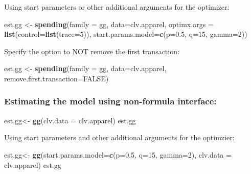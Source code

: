 \documentclass[
]{article}
\newenvironment{Shaded}{\begin{snugshade}}{\end{snugshade}}
\newcommand{\AttributeTok}[1]{\textcolor[rgb]{0.13,0.29,0.53}{#1}}
\newcommand{\ConstantTok}[1]{\textcolor[rgb]{0.56,0.35,0.01}{#1}}
\newcommand{\DecValTok}[1]{\textcolor[rgb]{0.00,0.00,0.81}{#1}}
\newcommand{\FloatTok}[1]{\textcolor[rgb]{0.00,0.00,0.81}{#1}}
\newcommand{\FunctionTok}[1]{\textcolor[rgb]{0.13,0.29,0.53}{\textbf{#1}}}
\newcommand{\NormalTok}[1]{#1}
\newcommand{\OtherTok}[1]{\textcolor[rgb]{0.56,0.35,0.01}{#1}}
\begin{document}
Using start parameters or other additional arguments for the optimizer:

\begin{Shaded}
\begin{Highlighting}[]
\NormalTok{est.gg }\OtherTok{\textless{}{-}} \FunctionTok{spending}\NormalTok{(}\AttributeTok{family =}\NormalTok{ gg, }\AttributeTok{data=}\NormalTok{clv.apparel, }
                   \AttributeTok{optimx.args =} \FunctionTok{list}\NormalTok{(}\AttributeTok{control=}\FunctionTok{list}\NormalTok{(}\AttributeTok{trace=}\DecValTok{5}\NormalTok{)),}
                   \AttributeTok{start.params.model=}\FunctionTok{c}\NormalTok{(}\AttributeTok{p=}\FloatTok{0.5}\NormalTok{, }\AttributeTok{q=}\DecValTok{15}\NormalTok{, }\AttributeTok{gamma=}\DecValTok{2}\NormalTok{))}
\end{Highlighting}
\end{Shaded}

Specify the option to NOT remove the first transaction:

\begin{Shaded}
\begin{Highlighting}[]
\NormalTok{est.gg }\OtherTok{\textless{}{-}} \FunctionTok{spending}\NormalTok{(}\AttributeTok{family =}\NormalTok{ gg, }\AttributeTok{data=}\NormalTok{clv.apparel, }
                   \AttributeTok{remove.first.transaction=}\ConstantTok{FALSE}\NormalTok{)}
\end{Highlighting}
\end{Shaded}

\subsubsection{\texorpdfstring{\textbf{Estimating the model using
non-formula
interface:}}{Estimating the model using non-formula interface:}}\label{estimating-the-model-using-non-formula-interface-6}

\begin{Shaded}
\begin{Highlighting}[]
\NormalTok{est.gg}\OtherTok{\textless{}{-}} \FunctionTok{gg}\NormalTok{(}\AttributeTok{clv.data =}\NormalTok{ clv.apparel)}
\NormalTok{est.gg}
\end{Highlighting}
\end{Shaded}

Using start parameters and other additional arguments for the optimzier:

\begin{Shaded}
\begin{Highlighting}[]
\NormalTok{est.gg}\OtherTok{\textless{}{-}} \FunctionTok{gg}\NormalTok{(}\AttributeTok{start.params.model=}\FunctionTok{c}\NormalTok{(}\AttributeTok{p=}\FloatTok{0.5}\NormalTok{, }\AttributeTok{q=}\DecValTok{15}\NormalTok{, }\AttributeTok{gamma=}\DecValTok{2}\NormalTok{), }\AttributeTok{clv.data =}\NormalTok{ clv.apparel)}
\NormalTok{est.gg}
\end{Highlighting}
\end{Shaded}
\end{document}
